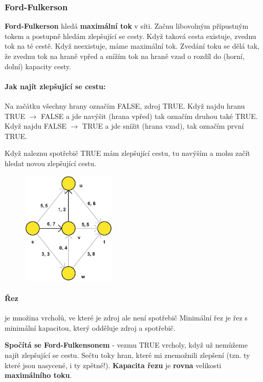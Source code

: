 \subsubsection{Ford-Fulkerson}
\textbf{Ford-Fulkerson} hledá \textbf{maximální tok} v síti. Začnu libovolným přípustným tokem a postupně hledám zlepšující se cesty. Když taková cesta existuje, zvednu tok na té cestě. Když neexistuje, máme maximální tok. Zvedání toku se dělá tak, že zvednu tok na hraně vpřed a snížím tok na hraně vzad o rozdíl do (horní, dolní) kapacity cesty.

\paragraph{Jak najít zlepšující se cestu:} Na začátku všechny hrany označím FALSE, zdroj TRUE. Když najdu hranu TRUE $\rightarrow$ FALSE a jde navýšit (hrana vpřed) tak označím druhou také TRUE. Když najdu FALSE $\rightarrow$ TRUE a jde snížit (hrana vzad), tak označím první TRUE.

Když naleznu spotřebič TRUE mám zlepšující cestu, tu navýším a mohu začít hledat novou zlepšující cestu.


\begin{figure}
  \begin{center}
    \vspace{-20px}
    \includegraphics[width=45mm]{08/images/toky}
    \vspace{-10px}
  \end{center}
\end{figure}

\paragraph{Řez} je množina vrcholů, ve které je zdroj ale není spotřebič Minimální řez je řez s minimální kapacitou, který odděluje zdroj a spotřebič.

\textbf{Spočítá se Ford-Fulkensonem} - vezmu TRUE vrcholy, když už nemůžeme najít zlepšující se cestu. Sečtu toky hran, které mi znemožnili zlepšení (tzn. ty které jsou nasycené, i ty zpětné!). \textbf{Kapacita řezu} je \textbf{rovna} velikosti \textbf{maximálního toku}.

